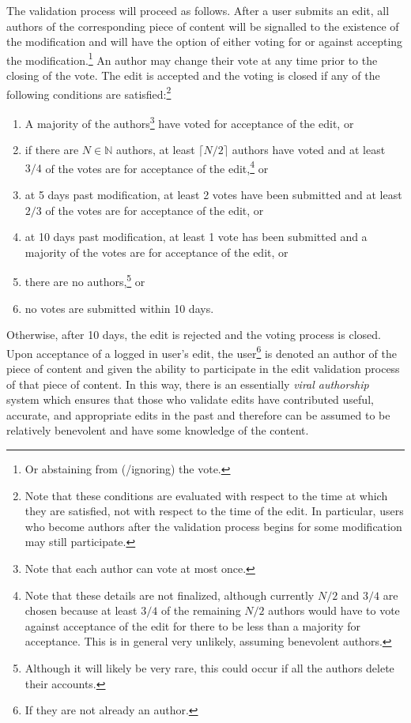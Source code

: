 \documentclass[12pt,letterpaper]{article}
\begin{document}
The validation process will proceed as follows. After a user submits an edit, all authors of the corresponding piece of content will be signalled to the existence of the modification and will have the option of either voting for or against accepting the modification.\footnote{Or abstaining from (/ignoring) the vote.} An author may change their vote at any time prior to the closing of the vote. The edit is accepted and the voting is closed if any of the following conditions are satisfied:\footnote{Note that these conditions are evaluated with respect to the time at which they are satisfied, not with respect to the time of the edit. In particular, users who become authors after the validation process begins for some modification may still participate.}
\begin{enumerate}
\item[1.] A majority of the authors\footnote{Note that each author can vote at most once.} have voted for acceptance of the edit, or
\item[2.] if there are $N \in \mathbb{N}$ authors, at least $\lceil N/2 \rceil$ authors have voted and at least $3/4$ of the votes are for acceptance of the edit,\footnote{Note that these details are not finalized, although currently $N/2$ and $3/4$ are chosen because at least $3/4$ of the remaining $N/2$ authors would have to vote against acceptance of the edit for there to be less than a majority for acceptance. This is in general very unlikely, assuming benevolent authors.} or
\item[3.] at 5 days past modification, at least 2 votes have been submitted and at least $2/3$ of the votes are for acceptance of the edit, or
\item[4.] at 10 days past modification, at least 1 vote has been submitted and a majority of the votes are for acceptance of the edit, or
\item[5.] there are no authors,\footnote{Although it will likely be very rare, this could occur if all the authors delete their accounts.} or
\item[6.] no votes are submitted within 10 days.
\end{enumerate}
Otherwise, after 10 days, the edit is rejected and the voting process is closed. Upon acceptance of a logged in user's edit, the user\footnote{If they are not already an author.} is denoted an author of the piece of content and given the ability to participate in the edit validation process of that piece of content. In this way, there is an essentially \textit{viral authorship} system which ensures that those who validate edits have contributed useful, accurate, and appropriate edits in the past and therefore can be assumed to be relatively benevolent and have some knowledge of the content. 
\end{document}
